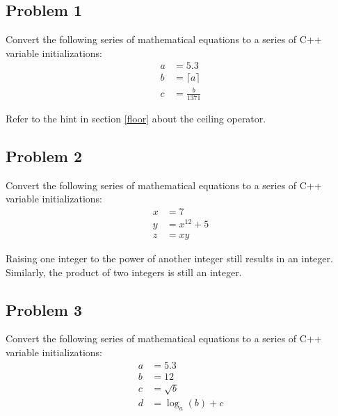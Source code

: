 \documentclass{article}
\newenvironment{hint}
    {\begin{tcolorbox}[title=Hint,colframe=white!70!blue,colback=white]}
    {\end{tcolorbox}}
\begin{document}
\subsection{Problem 1}

Convert the following series of mathematical equations to a series of C++ variable initializations:
\begin{equation*}
    \begin{aligned}
        a & = 5.3\\
        b & = \lceil a \rceil\\
        c & = \frac{b}{1371}
    \end{aligned}
\end{equation*}

Refer to the hint in section \ref{floor} about the ceiling operator.

\subsection{Problem 2}

Convert the following series of mathematical equations to a series of C++ variable initializations:
\begin{equation*}
    \begin{aligned}
        x & = 7\\
        y & = x^{12} + 5\\
        z & = xy
    \end{aligned}
\end{equation*}

\begin{hint}
    Raising one integer to the power of another integer still results in an integer. Similarly, the product of two integers is still an integer.
\end{hint}

\subsection{Problem 3}

Convert the following series of mathematical equations to a series of C++ variable initializations:
\begin{equation*}
    \begin{aligned}
        a & = 5.3\\
        b & = 12\\
        c & = \sqrt{b}\\
        d & = \log_a (b) + c\\
    \end{aligned}
\end{equation*}
\end{document}
